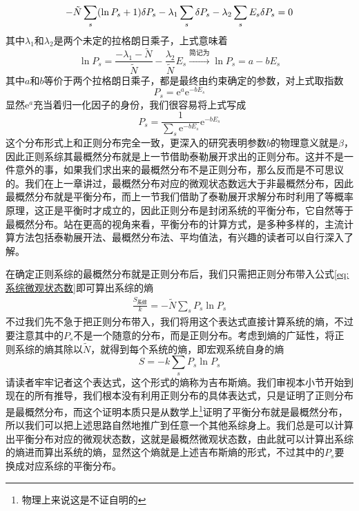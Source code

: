 \documentclass[../../main.tex]{subfiles}
\begin{document}
\begin{example}
\begin{solution}
        \begin{equation}
            -\tilde{N}\sum_s (\ln P_s+1)\var P_s-\lambda_1\sum_s \var P_s-\lambda_2\sum_sE_s\var P_s=0
        \end{equation}
        其中\(\lambda_1\)和\(\lambda_2\)是两个未定的拉格朗日乘子，上式意味着
        \begin{equation}
            \ln P_s=\frac{-\lambda_1-\tilde{N}}{\tilde{N}}-\frac{\lambda_2}{\tilde{N}}E_s \xrightarrow{\text{简记为}} \ln P_s=a-bE_s
        \end{equation}
        其中\(a\)和\(b\)等价于两个拉格朗日乘子，都是最终由约束确定的参数，对上式取指数
        \begin{equation}
            P_s=\mathrm{e}^{a}\mathrm{e}^{-bE_s}
        \end{equation}
        显然\(\mathrm{e}^{a}\)充当着归一化因子的身份，我们很容易将上式写成
        \begin{equation}
            P_s=\frac{1}{\sum_s\mathrm{e}^{-bE_s}}\mathrm{e}^{-bE_s}
        \end{equation}
        这个分布形式上和正则分布完全一致，更深入的研究表明参数\(b\)的物理意义就是\(\beta\)，因此正则系综其最概然分布就是上一节借助泰勒展开求出的正则分布。这并不是一件意外的事，如果我们求出来的最概然分布不是正则分布，那么反而是不可思议的。我们在上一章讲过，最概然分布对应的微观状态数远大于非最概然分布，因此最概然分布就是平衡分布，而上一节我们借助了泰勒展开求解分布时利用了等概率原理，这正是平衡时才成立的，因此正则分布是封闭系统的平衡分布，它自然等于最概然分布。站在更高的视角来看，平衡分布的计算方式，是多种多样的，主流计算方法包括泰勒展开法、最概然分布法、平均值法，有兴趣的读者可以自行深入了解。
    \end{solution}
\end{example}

在确定正则系综的最概然分布就是正则分布后，我们只需把正则分布带入公式\eqref{eq:系综微观状态数}即可算出系综的熵
\begin{equation}
    \begin{split}
        \frac{S_{\text{系综}}}{k}=-\tilde{N}\sum_sP_s\ln P_s
    \end{split} 
\end{equation}
不过我们先不急于把正则分布带入，我们将用这个表达式直接计算系统的熵，不过要注意其中的\(P_s\)不是一个随意的分布，而是正则分布。考虑到熵的广延性，将正则系综的熵其除以\(\tilde{N}\)，就得到每个系统的熵，即宏观系统自身的熵
\begin{equation}
    S=-k\sum_sP_s\ln P_s
\end{equation}
请读者牢牢记者这个表达式，这个形式的熵称为吉布斯熵。我们审视本小节开始到现在的所有推导，我们根本没有利用正则分布的具体表达式，只是证明了正则分布是最概然分布，而这个证明本质只是从数学上\footnote{物理上来说这是不证自明的}证明了平衡分布就是最概然分布，所以我们可以把上述思路自然地推广到任意一个其他系综身上。我们总是可以计算出平衡分布对应的微观状态数，这就是最概然微观状态数，由此就可以计算出系综的熵进而算出系统的熵，显然这个熵就是上述吉布斯熵的形式，不过其中的\(P_s\)要换成对应系综的平衡分布。
\end{document}
